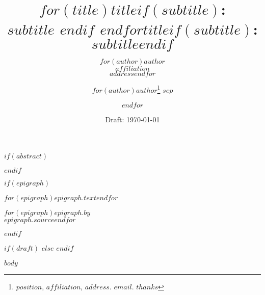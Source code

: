\documentclass[11pt,letterpaper,oneside]{article}
\title{$for(title)$\Large\textbf{$title$}$if(subtitle)$:\\ \textbf{$subtitle$} $endif$ $endfor$}
\author{$for(author)$\normalsize{$author$}\\ \footnotesize{$affiliation$}\\ \footnotesize{$address$}$endfor$}
\date{\footnotesize{Draft: \mydate\today}}
\title{\Large\textbf{{$title$}$if(subtitle)$:\\ $subtitle$}$endif$}
\author{$for(author)$\normalsize{$author$}\thanks{$position$, $affiliation$, $address$. $email$. $thanks$} $sep$ \and $endfor$}
\date{}
\begin{document}

\maketitle




$if(abstract)$
\begin{abstract}
\footnotesize
{}
\end{abstract}
$endif$

$if(epigraph)$
\epigraph{{$for(epigraph)$\itshape{$epigraph.text$}$endfor$}}%
{$for(epigraph)${$epigraph.by$}\\ {$epigraph.source$}$endfor$}
$endif$



$if(draft)$
\doublespacing
\RaggedRight
$else$
\singlespacing
$endif$

$body$
\end{document}
